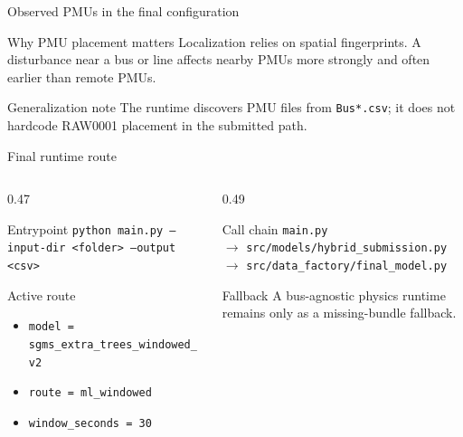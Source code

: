 \documentclass[10pt,aspectratio=169]{beamer}
\newcommand{\code}[1]{\texttt{\footnotesize #1}}
\begin{document}
\begin{frame}{Observed PMUs in the final configuration}
\small
\centering
{}
\vspace{5mm}
\begin{block}{Why PMU placement matters}
Localization relies on spatial fingerprints. A disturbance near a bus or line affects nearby PMUs more strongly and often earlier than remote PMUs.
\end{block}
\begin{alertblock}{Generalization note}
The runtime discovers PMU files from \code{Bus*.csv}; it does not hardcode RAW0001 placement in the submitted path.
\end{alertblock}
\end{frame}

\begin{frame}{Final runtime route}
\small
\begin{columns}[T,totalwidth=\textwidth]
\begin{column}{0.47\textwidth}
\begin{block}{Entrypoint}
\code{python main.py --input-dir <folder> --output <csv>}
\end{block}
\begin{block}{Active route}
\begin{itemize}
  \item \code{model = sgms\_extra\_trees\_windowed\_v2}
  \item \code{route = ml\_windowed}
  \item \code{window\_seconds = 30}
\end{itemize}
\end{block}
\end{column}
\begin{column}{0.49\textwidth}
\begin{exampleblock}{Call chain}
\code{main.py}\\
$\rightarrow$ \code{src/models/hybrid\_submission.py}\\
$\rightarrow$ \code{src/data\_factory/final\_model.py}
\end{exampleblock}
\begin{alertblock}{Fallback}
A bus-agnostic physics runtime remains only as a missing-bundle fallback.
\end{alertblock}
\end{column}
\end{columns}
\end{frame}
\end{document}
